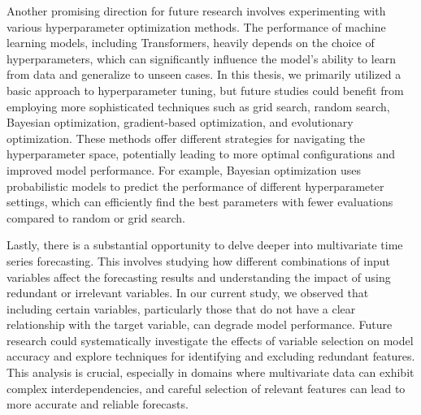 Another promising direction for future research involves experimenting with various hyperparameter optimization methods. The performance of machine learning models, including Transformers, heavily depends on the choice of hyperparameters, which can significantly influence the model's ability to learn from data and generalize to unseen cases. In this thesis, we primarily utilized a basic approach to hyperparameter tuning, but future studies could benefit from employing more sophisticated techniques such as grid search, random search, Bayesian optimization, gradient-based optimization, and evolutionary optimization. These methods offer different strategies for navigating the hyperparameter space, potentially leading to more optimal configurations and improved model performance. For example, Bayesian optimization uses probabilistic models to predict the performance of different hyperparameter settings, which can efficiently find the best parameters with fewer evaluations compared to random or grid search.

Lastly, there is a substantial opportunity to delve deeper into multivariate time series forecasting. This involves studying how different combinations of input variables affect the forecasting results and understanding the impact of using redundant or irrelevant variables. In our current study, we observed that including certain variables, particularly those that do not have a clear relationship with the target variable, can degrade model performance. Future research could systematically investigate the effects of variable selection on model accuracy and explore techniques for identifying and excluding redundant features. This analysis is crucial, especially in domains where multivariate data can exhibit complex interdependencies, and careful selection of relevant features can lead to more accurate and reliable forecasts.
